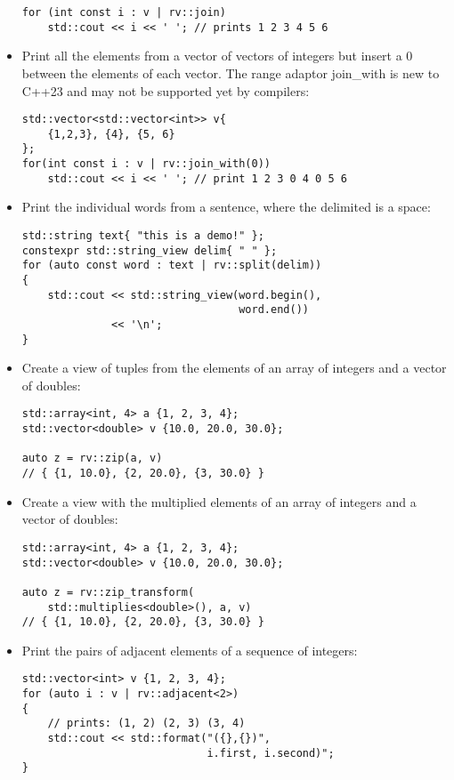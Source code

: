 \begin{itemize}
\begin{lstlisting}[style=styleCXX]
for (int const i : v | rv::join)
	std::cout << i << ' '; // prints 1 2 3 4 5 6
\end{lstlisting}

\item
Print all the elements from a vector of vectors of integers but insert a 0 between the elements of each vector. The range adaptor join\_with is new to C++23 and may not be supported yet by compilers:

\begin{lstlisting}[style=styleCXX]
std::vector<std::vector<int>> v{
	{1,2,3}, {4}, {5, 6}
};
for(int const i : v | rv::join_with(0))
	std::cout << i << ' '; // print 1 2 3 0 4 0 5 6
\end{lstlisting}

\item
Print the individual words from a sentence, where the delimited is a space:

\begin{lstlisting}[style=styleCXX]
std::string text{ "this is a demo!" };
constexpr std::string_view delim{ " " };
for (auto const word : text | rv::split(delim))
{
	std::cout << std::string_view(word.begin(),
								  word.end())
			  << '\n';
}
\end{lstlisting}

\item
Create a view of tuples from the elements of an array of integers and a vector of doubles:

\begin{lstlisting}[style=styleCXX]
std::array<int, 4> a {1, 2, 3, 4};
std::vector<double> v {10.0, 20.0, 30.0};

auto z = rv::zip(a, v)
// { {1, 10.0}, {2, 20.0}, {3, 30.0} }
\end{lstlisting}

\item
Create a view with the multiplied elements of an array of integers and a vector of doubles:

\begin{lstlisting}[style=styleCXX]
std::array<int, 4> a {1, 2, 3, 4};
std::vector<double> v {10.0, 20.0, 30.0};

auto z = rv::zip_transform(
	std::multiplies<double>(), a, v)
// { {1, 10.0}, {2, 20.0}, {3, 30.0} }
\end{lstlisting}

\item
Print the pairs of adjacent elements of a sequence of integers:

\begin{lstlisting}[style=styleCXX]
std::vector<int> v {1, 2, 3, 4};
for (auto i : v | rv::adjacent<2>)
{
	// prints: (1, 2) (2, 3) (3, 4)
	std::cout << std::format("({},{})",
							 i.first, i.second)";
}
\end{lstlisting}


\end{itemize}
